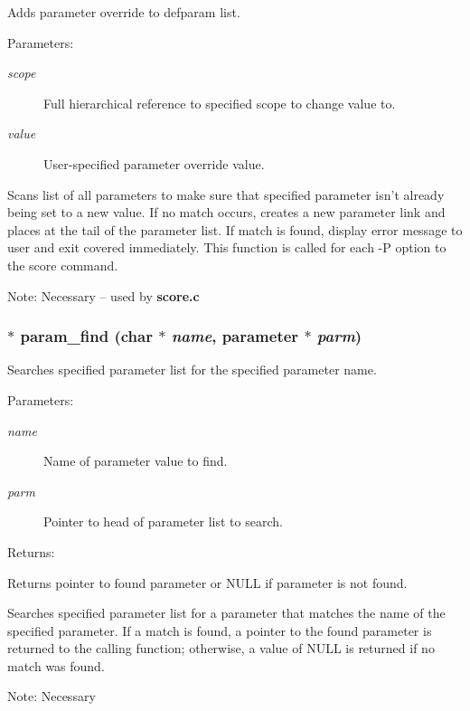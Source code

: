 Adds parameter override to defparam list.

\begin{Desc}
\item[Parameters: ]\par
\begin{description}
\item[{\em 
scope}]Full hierarchical reference to specified scope to change value to. \item[{\em 
value}]User-specified parameter override value.\end{description}
\end{Desc}
Scans list of all parameters to make sure that specified parameter isn't already being set to a new value. If no match occurs, creates a new parameter link and places at the tail of the parameter list. If match is found, display error message to user and exit covered immediately. This function is called for each -P option to the score command.

Note: Necessary -- used by {\bf score.c} 
\subsubsection{$\ast$ param\_\-find (char $\ast$ {\em name}, {\bf parameter} $\ast$ {\em parm})}\label{param_8h_a0}


Searches specified parameter list for the specified parameter name.

\begin{Desc}
\item[Parameters: ]\par
\begin{description}
\item[{\em 
name}]Name of parameter value to find. \item[{\em 
parm}]Pointer to head of parameter list to search.\end{description}
\end{Desc}
\begin{Desc}
\item[Returns: ]\par
Returns pointer to found parameter or NULL if parameter is not found.\end{Desc}
Searches specified parameter list for a parameter that matches the name of the specified parameter. If a match is found, a pointer to the found parameter is returned to the calling function; otherwise, a value of NULL is returned if no match was found.

Note: Necessary 